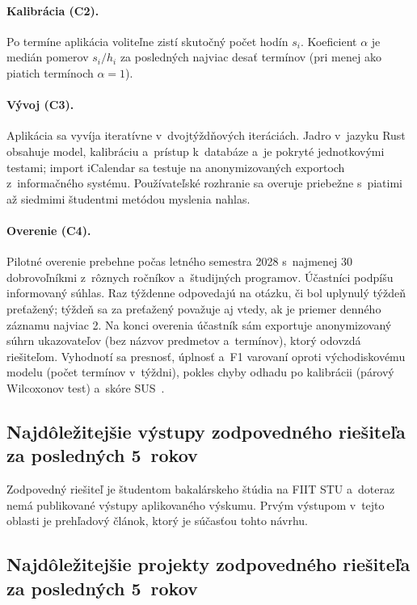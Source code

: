 \documentclass[11pt,a4paper]{article}
\begin{document}
\paragraph{Kalibrácia (C2).}
Po termíne aplikácia voliteľne zistí skutočný počet hodín $s_i$.
Koeficient $\alpha$ je medián pomerov $s_i / h_i$ za posledných najviac
desať termínov (pri menej ako piatich termínoch $\alpha = 1$).

\paragraph{Vývoj (C3).}
Aplikácia sa vyvíja iteratívne v~dvojtýždňových iteráciách. Jadro
v~jazyku Rust obsahuje model, kalibráciu a~prístup k~databáze a~je pokryté
jednotkovými testami; import iCalendar sa testuje na anonymizovaných
exportoch z~informačného systému. Používateľské rozhranie sa overuje
priebežne s~piatimi až siedmimi študentmi metódou myslenia nahlas.

\paragraph{Overenie (C4).}
Pilotné overenie prebehne počas letného semestra 2028 s~najmenej 30
dobrovoľníkmi z~rôznych ročníkov a~študijných programov. Účastníci
podpíšu informovaný súhlas. Raz týždenne odpovedajú na otázku, či bol
uplynulý týždeň preťažený; týždeň sa za preťažený považuje aj vtedy, ak je
priemer denného záznamu najviac 2. Na konci overenia účastník sám
exportuje anonymizovaný súhrn ukazovateľov (bez názvov predmetov
a~termínov), ktorý odovzdá riešiteľom. Vyhodnotí sa presnosť, úplnosť
a~F1 varovaní oproti východiskovému modelu (počet termínov v~týždni),
pokles chyby odhadu po kalibrácii (párový Wilcoxonov test) a~skóre
SUS~\cite{Brooke:SUS}.

\subsection{Najdôležitejšie výstupy zodpovedného riešiteľa za posledných 5~rokov}

Zodpovedný riešiteľ je študentom bakalárskeho štúdia na FIIT STU
a~doteraz nemá publikované výstupy aplikovaného výskumu. Prvým výstupom
v~tejto oblasti je prehľadový článok, ktorý je súčasťou tohto návrhu.

\subsection{Najdôležitejšie projekty zodpovedného riešiteľa za posledných 5~rokov}
\end{document}
